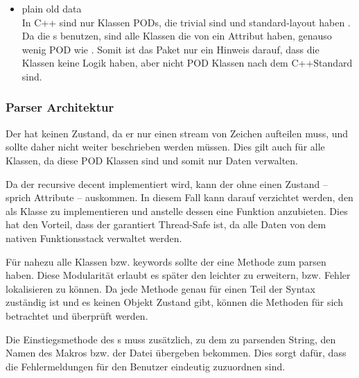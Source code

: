 {\begin{itemize}
          Da das  Instanzen von allen  Klassen aufnehmen kann, und einige Klassen wiederum ein  besitzen, kommt es hier zu einem dependency circle. Weil das  eine der meist benutzten Klassen ist, liegt die Auflösung des dependency circles bei den anderen Klassen.
        \item plain old data\\
          In C++ sind nur Klassen PODs, die trivial sind und standard-layout haben \autocite[9 Classes §10]{C++14-std}. Da die s  benutzen, sind alle Klassen die von  ein Attribut haben, genauso wenig POD wie . Somit ist das  Paket nur ein Hinweis darauf, dass die Klassen keine Logik haben, aber nicht POD Klassen nach dem C++Standard sind.
      \end{itemize}

    \subsubsection{Parser Architektur}
    \label{sssec:Parser Architektur}
      Der  hat keinen Zustand, da er nur einen stream von Zeichen aufteilen muss, und sollte daher nicht weiter beschrieben werden müssen. Dies gilt auch für alle  Klassen, da diese POD Klassen sind und somit nur Daten verwalten.

      Da der  recursive decent implementiert wird, kann der  ohne einen Zustand -- sprich Attribute -- auskommen. In diesem Fall kann darauf verzichtet werden, den  als Klasse zu implementieren und anstelle dessen eine  Funktion anzubieten. Dies hat den Vorteil, dass der  garantiert Thread-Safe ist, da alle Daten von dem nativen Funktionsstack verwaltet werden.

      Für nahezu alle  Klassen bzw. keywords sollte der  eine Methode zum parsen haben. Diese Modularität erlaubt es später den  leichter zu erweitern, bzw. Fehler lokalisieren zu können. Da jede Methode genau für einen Teil der Syntax zuständig ist und es keinen Objekt Zustand gibt, können die Methoden für sich betrachtet und überprüft werden.

      Die Einstiegsmethode des s muss zusätzlich, zu dem zu parsenden String, den Namen des Makros bzw. der Datei übergeben bekommen. Dies sorgt dafür, dass die Fehlermeldungen für den Benutzer eindeutig zuzuordnen sind.

}
